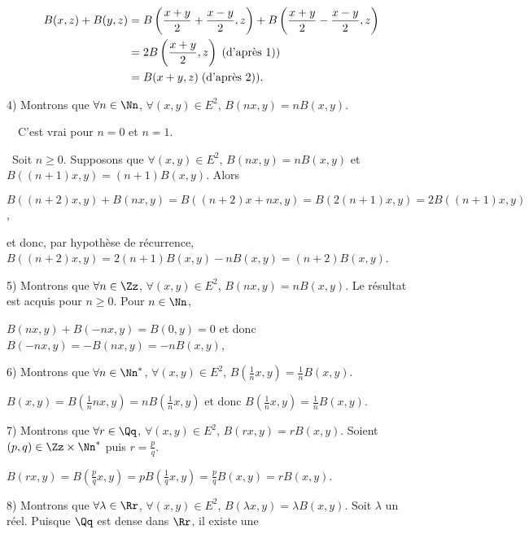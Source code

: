 {{\begin{align*}\ensuremath
B(x,z) + B(y,z)&= B\left(\frac{x+y}{2}+\frac{x-y}{2},z\right)+ B\left(\frac{x+y}{2}-\frac{x-y}{2},z\right)\\
 &=2B\left(\frac{x+y}{2},z\right)\;(\text{d'après 1)})\\
 &= B(x+y,z)\;(\text{d'après 2)}).
\end{align*}

4) Montrons que $\forall n\in\Nn$, $\forall(x,y)\in E^2$, $B(nx,y) = nB(x,y)$.

\textbullet~~C'est vrai pour $n = 0$ et $n=1$.

\textbullet~Soit $n\geqslant0$. Supposons que $\forall(x,y)\in E^2$, $B(nx,y) = nB(x,y)$ et $B((n+1)x,y) = (n+1)B(x,y)$. Alors

\begin{center}
$B((n+2)x,y) + B(nx,y) = B((n+2)x+nx,y) = B(2(n+1)x,y) = 2B((n+1)x,y)$,
\end{center}

et donc, par hypothèse de récurrence, $B((n+2)x,y)=2(n+1)B(x,y)-nB(x,y) =(n+2)B(x,y)$.

5) Montrons que $\forall n\in\Zz$, $\forall(x,y)\in E^2$, $B(nx,y) = nB(x,y)$. Le résultat est acquis pour $n\geqslant 0$. Pour $n\in\Nn$,

\begin{center}
$B(nx,y) + B(-nx,y) = B(0,y) = 0$ et donc $B(-nx,y) =- B(nx,y)=-nB(x,y)$,
\end{center}

6) Montrons que $\forall n\in\Nn^*$, $\forall(x,y)\in E^2$, $B\left(\frac{1}{n}x,y\right) =\frac{1}{n}B(x,y)$.

\begin{center}
$B(x,y) =B\left(\frac{1}{n}nx,y\right) =nB\left(\frac{1}{n}x,y\right)$ et donc $B\left(\frac{1}{n}x,y\right) =\frac{1}{n}B(x,y)$.
\end{center}

7) Montrons que $\forall r\in\Qq$, $\forall(x,y)\in E^2$, $B(rx,y) = rB(x,y)$. Soient $(p,q)\in\Zz\times\Nn^*$ puis $r=\frac{p}{q}$.

\begin{center}
$B(rx,y) = B\left(\frac{p}{q}x,y\right) =pB\left(\frac{1}{q}x,y\right)=\frac{p}{q}B(x,y) = rB(x,y)$.
\end{center}

8) Montrons que $\forall\lambda\in\Rr$, $\forall(x,y)\in E^2$, $B(\lambda x,y) =\lambda B(x,y)$. Soit $\lambda$ un réel. Puisque $\Qq$ est dense dans $\Rr$, il existe une

}}
